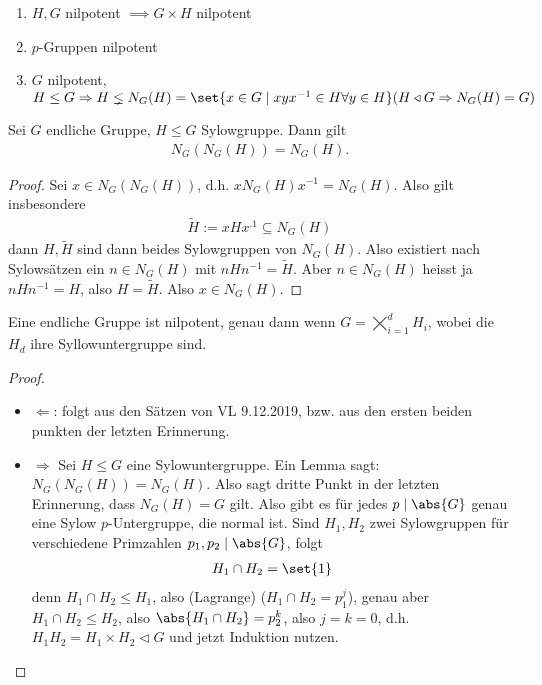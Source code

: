 \begin{erinnerung}
	\begin{enumerate}
		\item $H,G$ nilpotent $\implies G \times H$ nilpotent
		\item $p$-Gruppen nilpotent
		\item $G$ nilpotent, $H \le G \implies H \lneq N_G(H) = \set{x \in G \mid xyx^{-1}\in H \forall y \in H} (H \lhd G \implies N_G(H) = G)$
	\end{enumerate}
\end{erinnerung}
\begin{lemma}
	Sei $G$ endliche Gruppe, $H \le G$ Sylowgruppe. Dann gilt
	\begin{align*}
		N_G(N_G(H)) = N_G(H).
	\end{align*}
\end{lemma}
\begin{proof}
	Sei $x \in N_G(N_G(H))$, d.h. $xN_G(H)x^{-1} = N_G(H)$. Also gilt insbesondere
	\begin{align*}
		\tilde{H} := xHx^{.1} \subseteq N_G(H)
	\end{align*}
	dann $H, \tilde{H}$ sind dann beides Sylowgruppen von $N_G(H)$. Also existiert nach Sylowsätzen ein $n \in N_G(H)$ mit $nHn^{-1} = \tilde{H}$. Aber $n \in N_G(H)$ heisst ja $nHn^{-1} = H$, also $H = \tilde{H}$. Also $x \in N_G(H)$.
\end{proof}
\begin{proposition}
	Eine endliche Gruppe ist nilpotent, genau dann wenn $G = \bigtimes_{i=1}^d H_i$, wobei die $H_d$ ihre Syllowuntergruppe sind.
\end{proposition}
\begin{proof}
	\begin{itemize}
		\item $\Leftarrow$: folgt aus den Sätzen von VL 9.12.2019, bzw. aus den ersten beiden punkten der letzten Erinnerung. %
		\item $\Rightarrow$ Sei $H \le G$ eine Sylowuntergruppe. Ein Lemma sagt: $N_G(N_G(H)) = N_G(H)$. Also sagt dritte Punkt in der letzten Erinnerung, dass $N_G(H) = G$ gilt. Also gibt es für jedes $p \mid \abs{G}$ genau eine Sylow $p$-Untergruppe, die normal ist. Sind $H_1,H_2$ zwei Sylowgruppen für verschiedene Primzahlen $p_1,p_2 \mid \abs{G}$, folgt
		\begin{align*}
			H_1 \cap H_2 = \set{1}
		\end{align*}
		denn $H_1 \cap H_2 \le H_1$, also (Lagrange) ($H_1 \cap H_2 = p^j_1$), genau aber $H_1 \cap H_2 \le H_2$, also $\abs{H_1 \cap H_2} = p_2^k$, also $j = k = 0$, d.h. $H_1H_2 = H_1 \times H_2 \lhd G$ und jetzt Induktion nutzen.
	\end{itemize}
\end{proof}
